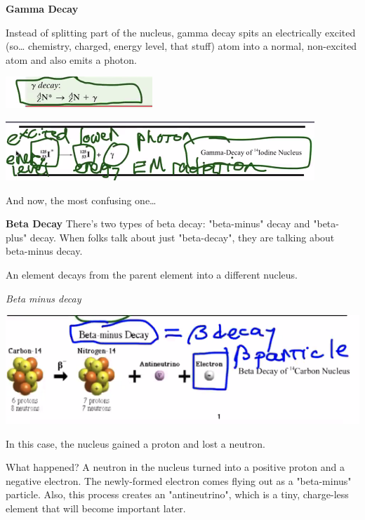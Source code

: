 \documentclass[letterpaper]{article}
\begin{document}
\textbf{Gamma Decay}

Instead of splitting part of the nucleus, gamma decay spits an
electrically excited (so\ldots{} chemistry, charged, energy level, that
stuff) atom into a normal, non-excited atom and also emits a photon.

\begin{center}
\includegraphics[width=.9\linewidth]{gammadecaybetter.png}
\end{center}

\begin{center}
\includegraphics[width=.9\linewidth]{gammadecay.png}
\end{center}

And now, the most confusing one\ldots{}

\textbf{Beta Decay} There's two types of beta decay: "beta-minus" decay and
"beta-plus" decay. When folks talk about just "beta-decay", they are
talking about beta-minus decay.

An element decays from the parent element into a different nucleus.

\emph{Beta minus decay}

\begin{center}
\includegraphics[width=.9\linewidth]{betaminusdecay.png}
\end{center}

In this case, the nucleus gained a proton and lost a neutron.

What happened? A neutron in the nucleus turned into a positive proton
and a negative electron. The newly-formed electron comes flying out as a
"beta-minus" particle. Also, this process creates an "antineutrino",
which is a tiny, charge-less element that will become important later.
\end{document}
